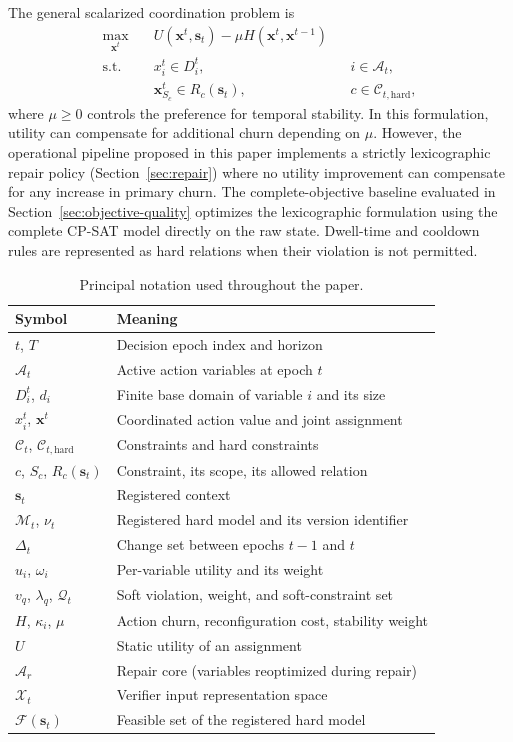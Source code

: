 \documentclass[pdflatex,sn-mathphys-num,iicol,oneside]{sn-jnl}
\newcommand{\cpsat}{\textsc{CP-SAT}\xspace}
\begin{document}
The general scalarized coordination problem is
\begin{align}
\max_{\bm{x}^{t}}\quad&
U(\bm{x}^{t},\bm{s}_t)
-
\mu H(\bm{x}^{t},\bm{x}^{t-1})
\label{eq:problem-objective}\\
\text{s.t.}\quad&
x_i^t\in D_i^t,
&& i\in\mathcal{A}_t,
\nonumber\\
&
\bm{x}_{S_c}^t\in R_c(\bm{s}_t),
&& c\in\mathcal{C}_{t,\mathrm{hard}},
\label{eq:problem-hard}
\end{align}
where $\mu\geq 0$ controls the preference for temporal stability. In this formulation, utility can compensate for additional churn depending on $\mu$.
However, the operational pipeline proposed in this paper implements a strictly lexicographic repair policy (Section~\ref{sec:repair}) where no utility improvement can compensate for any increase in primary churn. The complete-objective baseline evaluated in Section~\ref{sec:objective-quality} optimizes the lexicographic formulation
using the complete \cpsat model directly on the raw state. Dwell-time and cooldown rules are represented as hard relations when
their violation is not permitted.

\begin{table}[t]
\centering
\caption{Principal notation used throughout the paper.}
\label{tab:notation}
\footnotesize
\setlength{\tabcolsep}{3pt}
\begin{tabular}{@{}l>{\raggedright\arraybackslash}p{42mm}@{}}
\toprule
Symbol & Meaning\\
\midrule
$t$, $T$ & Decision epoch index and horizon\\
$\mathcal{A}_t$ & Active action variables at epoch $t$\\
$D_i^t$, $d_i$ & Finite base domain of variable $i$ and its size\\
$x_i^t$, $\bm{x}^t$ & Coordinated action value and joint assignment\\
$\mathcal{C}_t$, $\mathcal{C}_{t,\mathrm{hard}}$ & Constraints and hard constraints\\
$c$, $S_c$, $R_c(\bm{s}_t)$ & Constraint, its scope, its allowed relation\\
$\bm{s}_t$ & Registered context\\
$\mathcal{M}_t$, $\nu_t$ & Registered hard model and its version identifier\\
$\Delta_t$ & Change set between epochs $t-1$ and $t$\\
$u_i$, $\omega_i$ & Per-variable utility and its weight\\
$v_q$, $\lambda_q$, $\mathcal{Q}_t$ & Soft violation, weight, and soft-constraint set\\
$H$, $\kappa_i$, $\mu$ & Action churn, reconfiguration cost, stability weight\\
$U$ & Static utility of an assignment\\
$\mathcal{A}_r$ & Repair core (variables reoptimized during repair)\\
$\mathcal{X}_t$ & Verifier input representation space\\
$\mathcal{F}(\bm{s}_t)$ & Feasible set of the registered hard model\\
\bottomrule
\end{tabular}
\end{table}
\end{document}
